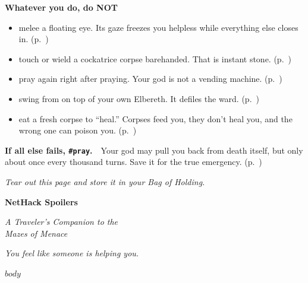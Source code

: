 \documentclass[openany,10pt]{book}
\begin{document}
\begin{center}
\begin{minipage}{0.82\textwidth}
\vspace{0.9em}
\textbf{Whatever you do, do NOT}
\begin{itemize}[label=\(\times\),leftmargin=1.6em,itemsep=0.3em,topsep=0.2em]
\item melee a floating eye. Its gaze freezes you helpless while everything else closes in. (p.~\pageref*{eyes-and-spheres-e})
\item touch or wield a cockatrice corpse barehanded. That is instant stone. (p.~\pageref*{cockatrices-c})
\item pray again right after praying. Your god is not a vending machine. (p.~\pageref*{prayer})
\item swing from on top of your own Elbereth. It defiles the ward. (p.~\pageref*{defiling-the-name-of-elbereth-important})
\item eat a fresh corpse to ``heal.'' Corpses feed you, they don't heal you, and the wrong one can poison you. (p.~\pageref*{dangerous-foods})
\end{itemize}

\vspace{1em}
{\centering\textbf{If all else fails, \texttt{\#pray}.}\ \ Your god may pull you back from death itself, but only about once every thousand turns. Save it for the true emergency. (p.~\pageref*{prayer})\par}
\end{minipage}
\end{center}
\vspace{1.6em}
{\centering\itshape Tear out this page and store it in your Bag of Holding.\par}
\normalsize
\clearpage

\begin{titlepage}
\thispagestyle{empty}
\vspace*{2in}
\begin{center}
{\huge\bfseries NetHack Spoilers\par}
\vspace{0.8em}
{\Large\itshape A Traveler's Companion to the\\[0.2em]Mazes of Menace}
\end{center}
\end{titlepage}

\thispagestyle{empty}
\vspace*{\fill}
\begin{center}
{\itshape You feel like someone is helping you.}
\end{center}
\vspace*{\fill}
\clearpage

\frontmatter
\thispagestyle{empty}
{
\hypersetup{linkcolor=black}
\setcounter{tocdepth}{0}
\small
\setlength{\parskip}{0.3em}
\renewcommand{\baselinestretch}{0.92}\selectfont
\makeatletter
\renewcommand{\l@chapter}{\@dottedtocline{0}{1.5em}{0em}}
\makeatother
\tableofcontents
}

\mainmatter

$body$
\end{document}

